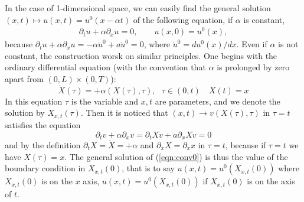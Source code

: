 \documentclass[a4paper,twoside,12pt]{book}
\def\p{\partial}
\begin{document}
In the case of 1-dimensional space, we can easily find the general solution
$(x,t)\mapsto u(x,t)=u^0(x-\alpha t)$ of the following equation, if $\alpha$ is constant,
\begin{eqnarray}
\label{eqn:conv0}
\p_t u +\alpha\p_x u=0,\qquad u(x,0)=u^0(x),
\end{eqnarray}
because $\p_t u +\alpha\p_x u=-\alpha\dot{u}^0+a\dot{u}^0=0$,
where $\dot{u}^0=du^0(x)/dx$.
Even if $\alpha$ is not constant, the construction worsk on similar principles.
One begins with the ordinary differential equation
(with the convention that $\alpha$
is prolonged by zero apart from $(0,L)\times (0,T)$):
\[
\dot{X}(\tau )=+\alpha(X(\tau ),\tau ),~~~\tau \in (0,t)\quad X(t)=x%
\]%
In this equation $\tau$ is the variable and $x,t$ are parameters,
and we denote the solution by $X_{x,t}(\tau )$.
Then it is noticed that $(x,t)\rightarrow v(X(\tau ),\tau )$ in
$\tau=t$ satisfies the equation
\[
\p _{t}v+\alpha\p _{x}v=\p _{t}X\dot{v}+a\p _{x}X\dot{v}%
=0
\]%
and by the definition $\p _{t}X=\dot{X}=+\alpha$ and %
$\p_{x}X=\p _{x}x$ in $\tau=t$, because
if $\tau =t$ we have $X(\tau )=x$.
The general solution of (\ref{eqn:conv0}) is thus the value of the boundary condition in $X_{x, t}(0)$,
that is to say $u(x,t)=u^{0}(X_{x,t}(0))$ where $X_{x,t}(0)$ is on the
$x$ axis, $u(x,t)=u^{0}(X_{x,t}(0))$ if $X_{x,t}(0)$ is on the axis of
$t$.
\end{document}
